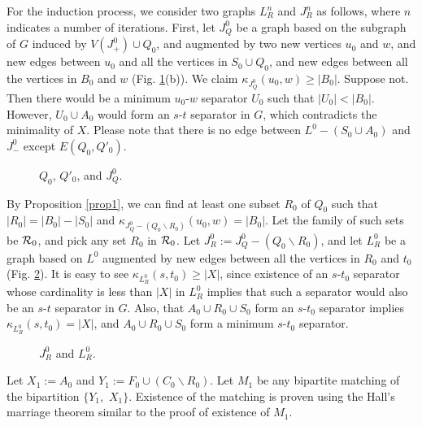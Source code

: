 \documentclass{article}
\begin{document}
For the induction process, we consider two graphs $L_R^n$ and $J_R^n$ as follows,
where $n$ indicates a number of iterations.
First, let $J_Q^0$ be a graph based on the subgraph of $G$ induced by $V(J_+^0)\cup Q_0$,
and augmented by two new vertices $u_0$ and $w$, and new edges between $u_0$ and all the vertices in $S_0 \cup Q_0$,
and new edges between all the vertices in $B_0$ and $w$ (Fig. \ref{label_fig7}(b)).
We claim $\kappa_{J_Q^0}(u_0, w) \ge |B_0|$. Suppose not.
Then there would be a minimum $u_0$-$w$ separator $U_0$ such that $|U_0| < |B_0|$.
However, $U_0\cup A_0$ would form an $s$-$t$ separator in $G$, which contradicts the minimality of $X$.
Please note that there is no edge between $L^0 - (S_0\cup A_0)$ and $J_-^0$ except $E(Q_0, Q'_0)$.


\begin{figure}\begin{center}
\caption[Fig7]{$Q_0$, $Q'_0$, and $J_Q^0$.}
\label{label_fig7}
\end{center}\end{figure}

By Proposition \ref{prop1}, we can find at least one subset $R_0$ of $Q_0$ such that $|R_0| = |B_0| - |S_0|$ and
$\kappa_{J_Q^0 - (Q_0\backslash R_0)}(u_0, w) = |B_0|$.
Let the family of such sets be ${\cal R}_0$, and pick any set $R_0$ in ${\cal R}_0$.
Let $J_R^0 := J_Q^0 - (Q_0\backslash R_0)$, and
let $L_R^0$ be a graph based on $L^0$ augmented by new edges between all the vertices in $R_0$ and $t_0$
(Fig. \ref{label_fig8}).
It is easy to see $\kappa_{L_R^0}(s, t_0) \ge |X|$, since existence of an $s$-$t_0$ separator whose cardinality
is less than $|X|$ in $L_R^0$ implies that such a separator would also be an $s$-$t$ separator in $G$.
Also, that $A_0\cup R_0\cup S_0$ form an $s$-$t_0$ separator implies $\kappa_{L_R^0}(s, t_0) = |X|$, and
 $A_0\cup R_0\cup S_0$ form a minimum $s$-$t_0$ separator.

\begin{figure}\begin{center}
\caption[Fig8]{$J_R^0$ and $L_R^0$.}
\label{label_fig8}
\end{center}\end{figure}

Let $X_1 := A_0$ and $Y_1 := F_0\cup (C_0\backslash R_0)$.
Let $M_1$ be any bipartite matching of the bipartition $\{Y_1,\,\, X_1\}$.
Existence of the matching is proven using the Hall's marriage theorem similar to the proof of existence of $M_1$.
\end{document}
